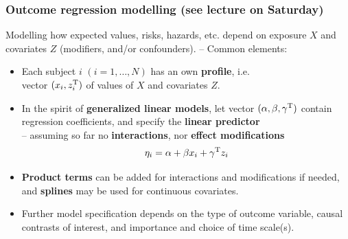 \documentclass[12pt,dvipsnames,t,aspectratio=169, handout%
]{beamer}
\begin{document}
\begin{frame}
\frametitle{\large Outcome regression modelling (see lecture on Saturday)}

Modelling how expected values, risks, hazards, etc. depend on %
exposure $X$ and covariates $Z$ (modifiers, and/or confounders). -- 
Common elements:
 \begin{itemize} 
 \item
Each subject $i$ $(i=1, \dots, N)$ has an own {\bf profile}, i.e. \\
vector $(x_{i}, z_i^{\small\text{T}})$ of values of $X$ and covariates $Z$.   
\pause
\medskip
\item
 In the spirit of \textbf{generalized linear models}, let vector  
  $(\alpha, \beta, \gamma^{\small\text{T}})$ contain regression coefficients,
  and specify the \textbf{linear predictor} \\
	-- assuming so far no {\bf interactions}, nor {\bf effect modifications} 
 $$ \eta_i = \alpha + \beta x_i + \gamma^{\small\text{T}}z_i$$
\item
{\bf Product terms} can be added for interactions and modifications if needed, and 
{\bf splines} may be used for continuous covariates.
\medskip
\item
Further model specification depends on the type of outcome variable, 
causal contrasts of interest, and importance and choice of time scale(s).  
\end{itemize} 
\end{frame}
\end{document}
